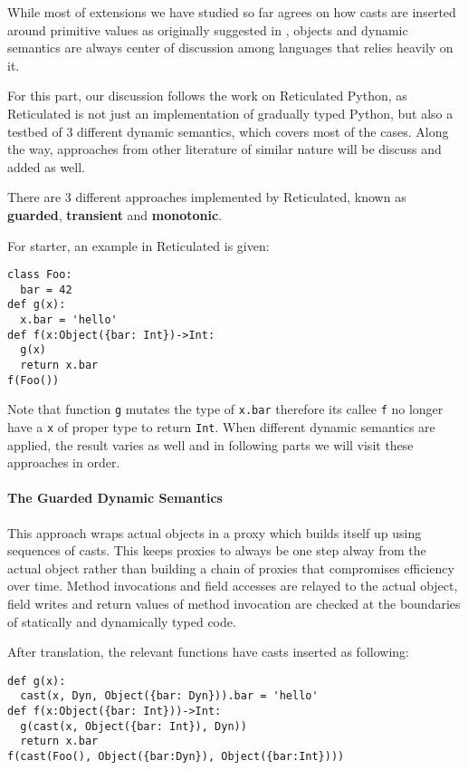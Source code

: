 While most of extensions we have studied so far agrees on how casts are inserted
around primitive values as originally suggested in \cite{siek2006gradual},
objects and dynamic semantics are always center of discussion among languages
that relies heavily on it.

For this part, our discussion follows the work on Reticulated Python,
as Reticulated is not just an implementation of gradually typed Python,
but also a testbed of 3 different dynamic semantics, which covers most of the cases.
Along the way, approaches from other literature of similar nature will be discuss and added as well.

There are 3 different approaches implemented by Reticulated, known as \textbf{guarded}, \textbf{transient}
and \textbf{monotonic}.

For starter, an example in Reticulated is given:

\begin{verbatim}
class Foo:
  bar = 42
def g(x):
  x.bar = 'hello'
def f(x:Object({bar: Int})->Int:
  g(x)
  return x.bar
f(Foo())
\end{verbatim}

Note that function \texttt{g} mutates the type of \texttt{x.bar} therefore its callee \texttt{f}
no longer have a \texttt{x} of proper type to return \texttt{Int}.
When different dynamic semantics are applied, the result varies as well and in following parts
we will visit these approaches in order.

\paragraph{The Guarded Dynamic Semantics}

This approach wraps actual objects in a proxy which builds itself up using sequences of casts.
This keeps proxies to always be one step alway from the actual object rather than building
a chain of proxies that compromises efficiency over time.
Method invocations and field accesses are relayed to the actual object,
field writes and return values of method invocation are checked at the boundaries
of statically and dynamically typed code.

After translation, the relevant functions have casts inserted as following:

\begin{verbatim}
def g(x):
  cast(x, Dyn, Object({bar: Dyn})).bar = 'hello'
def f(x:Object({bar: Int}))->Int:
  g(cast(x, Object({bar: Int}), Dyn))
  return x.bar
f(cast(Foo(), Object({bar:Dyn}), Object({bar:Int})))
\end{verbatim}

